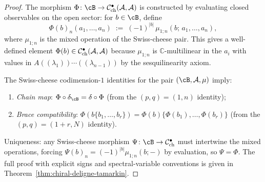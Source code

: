 \begin{proof}
The morphism $\Phi \colon \cB \to
\mathcal{C}^{\bullet}_{\mathrm{ch}}(\cA, \cA)$ is constructed
by evaluating closed observables on the open sector: for
$b \in \cB$, define
\[
\Phi(b)_n(a_1, \ldots, a_n)
\;:=\;
(-1)^{|b|}\,\mu_{1;n}(b;\, a_1, \ldots, a_n),
\]
where $\mu_{1;n}$ is the mixed operation of the Swiss-cheese pair.
This gives a well-defined element $\Phi(b) \in
\mathcal{C}^{\bullet}_{\mathrm{ch}}(\mathcal{A}, \mathcal{A})$ because
$\mu_{1;n}$ is $\mathbb{C}$-multilinear in the $a_i$ with values
in $A((\lambda_1))\cdots((\lambda_{n-1}))$ by the sesquilinearity
axiom.

The Swiss-cheese codimension-$1$ identities for the pair
$(\cB, \cA, \mu)$ imply:
\begin{enumerate}[label=\textup{(\roman*)}]
\item \emph{Chain map}: $\Phi \circ \delta_\cB = \delta \circ \Phi$
 (from the $(p,q) = (1,n)$ identity);
\item \emph{Brace compatibility}: $\Phi(b\{b_1, \ldots, b_r\})
 = \Phi(b)\{\Phi(b_1), \ldots, \Phi(b_r)\}$
 (from the $(p, q) = (1+r, N)$ identity).
\end{enumerate}
Uniqueness: any Swiss-cheese morphism
$\Psi \colon \cB \to \mathcal{C}^{\bullet}_{\mathrm{ch}}$
must intertwine the mixed operations, forcing
$\Psi(b)_n = (-1)^{|b|}\mu_{1;n}(b; -)$ by evaluation, so
$\Psi = \Phi$.
The full proof with explicit signs and spectral-variable
conventions is given in Theorem~\ref{thm:chiral-deligne-tamarkin}.
\end{proof}

